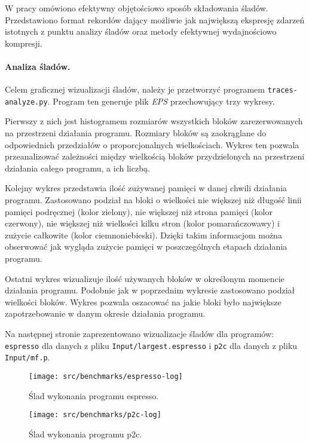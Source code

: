 \documentclass[12pt,a4paper,titlepage,twoside]{mwart}
\begin{document}
W pracy \cite{chilimbi00designing} omówiono efektywny objętościowo sposób
składowania śladów. Przedstawiono format rekordów dający możliwie jak
największą ekspresję zdarzeń istotnych z punktu analizy śladów oraz metody
efektywnej wydajnościowo kompresji.

\paragraph{Analiza śladów.} Celem graficznej wizualizacji śladów, należy je
przetworzyć programem \texttt{traces-analyze.py}. Program ten generuje plik
\textit{EPS} przechowujący trzy wykresy.

Pierwszy z nich jest histogramem rozmiarów wszystkich bloków zarezerwowanych na
przestrzeni działania programu. Rozmiary bloków są zaokrąglane do odpowiednich
przedziałów o proporcjonalnych wielkościach. Wykres ten pozwala przeanalizować
zależności między wielkością bloków przydzielonych na przestrzeni działania
całego programu, a ich liczbą.

Kolejny wykres przedstawia ilość zużywanej pamięci w danej chwili działania
programu. Zastosowano podział na bloki o wielkości nie większej niż długość
linii pamięci podręcznej (kolor zielony), nie większej niż strona pamięci
(kolor czerwony), nie większej niż wielkości kilku stron (kolor pomarańczowawy)
i zużycie całkowite (kolor ciemnoniebieski). Dzięki takim informacjom można
obserwować jak wygląda zużycie pamięci w poszczególnych etapach działania
programu.

Ostatni wykres wizualizuje ilość używanych bloków w określonym momencie
działania programu. Podobnie jak w poprzednim wykresie zastosowano podział
wielkości bloków. Wykres pozwala oszacować na jakie bloki było największe
zapotrzebowanie w danym okresie działania programu.

Na następnej stronie zaprezentowano wizualizacje śladów dla programów:
\texttt{espresso} dla danych z pliku \texttt{Input/largest.espresso} i
\texttt{p2c} dla danych z pliku \texttt{Input/mf.p}.

\begin{figure}%
\centering
\texttt{[image: src/benchmarks/espresso-log]}
\caption{Ślad wykonania programu espresso.}

\vspace{0.5in}

\texttt{[image: src/benchmarks/p2c-log]}
\caption{Ślad wykonania programu p2c.}
\end{figure}
\end{document}
